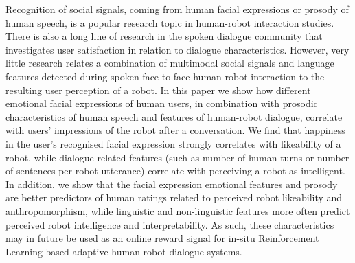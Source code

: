 Recognition of social signals, coming from human facial expressions or prosody of human speech, is a popular research topic in human-robot interaction studies. There is also a long line of research in the spoken dialogue community that investigates user satisfaction in relation to dialogue characteristics. However, very little research relates a combination of multimodal social signals and language features detected during spoken face-to-face human-robot interaction to the resulting user perception of a robot. In this paper we show how different emotional facial expressions of human users, in combination with prosodic characteristics of human speech and features of human-robot dialogue, correlate with users' impressions of the robot after a conversation. We find that happiness in the user's recognised facial expression strongly correlates with likeability of a robot, while dialogue-related features (such as number of human turns or number of sentences per robot utterance) correlate with perceiving a robot as intelligent. In addition, we show that the facial expression emotional features and prosody are better predictors of human ratings related to perceived robot likeability and anthropomorphism, while linguistic and non-linguistic features more often predict perceived robot intelligence and interpretability. As such, these characteristics may in future be used as an online reward signal for in-situ Reinforcement Learning-based adaptive human-robot dialogue systems.
